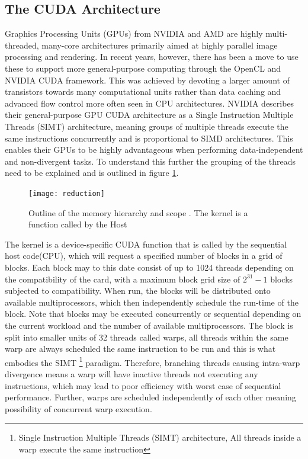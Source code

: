 \documentclass[a4paper, 12pt]{report}
\begin{document}
\subsection{The CUDA Architecture} \label{Cuda} %
Graphics Processing Units (GPUs) from NVIDIA and AMD are highly multi-threaded,
many-core architectures primarily 
aimed at highly parallel image processing and rendering. In recent years,
however, 
there has been a move to use these to support more general-purpose computing
through the OpenCL and NVIDIA CUDA framework.
This was achieved by devoting a larger amount of transistors towards many
computational units rather than data caching and advanced 
flow control more often seen in CPU architectures. NVIDIA describes their
general-purpose GPU CUDA architecture as a Single Instruction 
Multiple Threads (SIMT) architecture, meaning groups of multiple threads execute
the same instructions concurrently and is proportional to SIMD architectures. 
This enables their GPUs to be highly advantageous when performing
data-independent and non-divergent tasks. 
To understand this further the grouping of the threads need to be explained and
is outlined in figure \ref{fig:reduction}.
\begin{figure}
\centering
\texttt{[image: reduction]}
\caption{Outline of the memory hierarchy and scope
\label{fig:reduction}. The kernel is a function called by the Host}
\end{figure}
The kernel is a device-specific CUDA function that is called by the sequential
host code(CPU), 
which will request a specified number of blocks in a grid of blocks. 
Each block may to this date consist of up to 1024 threads depending on the
compatibility of the card, 
with a maximum block grid size of $2^{31}-1$ blocks subjected to compatibility. 
When run, the blocks will be distributed onto available multiprocessors, which
then independently schedule the run-time of the block. 
Note that blocks may be executed concurrently or sequential depending on the
current workload and the number of available multiprocessors. 
The block is split into smaller units of 32 threads called warps, all threads
within the same warp are always scheduled the same instruction 
to be run and this is what embodies the SIMT \footnote{Single Instruction
Multiple Threads (SIMT) architecture, All threads inside a warp execute the same
instruction} paradigm. 
Therefore, branching threads causing intra-warp divergence means a warp will
have inactive threads not executing any instructions,  which may lead to poor
efficiency with worst case of sequential performance. 
Further, warps are scheduled independently of each other meaning possibility of
concurrent warp execution.
\end{document}
